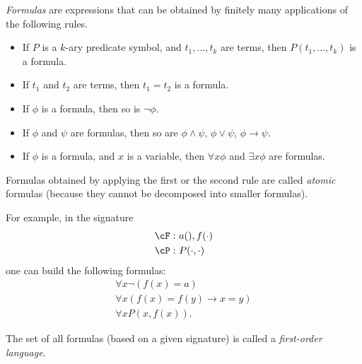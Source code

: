 \begin{page}

\begin{dfn}
\emph{Formulas} are expressions that can be obtained by finitely many applications of the following rules.
\begin{itemize}
\item
If $P$ is a $k$-ary predicate symbol, and $t_1, \ldots, t_k$ are terms, then $P(t_1, \ldots, t_k)$ is a formula.
\item
If $t_1$ and $t_2$ are terms, then $t_1 = t_2$ is a formula.
\item
If $\phi$ is a formula, then so is $\neg \phi$.
\item
If $\phi$ and $\psi$ are formulas, then so are $\phi \wedge \psi$, $\phi \vee \psi$, $\phi \to \psi$.
\item
If $\phi$ is a formula, and $x$ is a variable, then $\forall x \phi$ and $\exists x \phi$ are formulas.
\end{itemize}
\end{dfn}

\end{page}

\begin{page}

Formulas obtained by applying the first or the second rule are called \emph{atomic} formulas (because they cannot be decomposed into smaller formulas).

For example, in the signature
\begin{align*}
\cF:\ &a(), f(\cdot) \\
\cP:\ &P(\cdot, \cdot)
\end{align*}
one can build the following formulas:
\begin{gather*}
\forall x \neg(f(x) = a)\\
\forall x (f(x)=f(y) \to x=y)\\
\forall x P(x, f(x)).
\end{gather*}



\end{page}

\begin{page}

\begin{dfn}
The set of all formulas (based on a given signature) is called a \emph{first-order language}.
\end{dfn}

\end{page}

